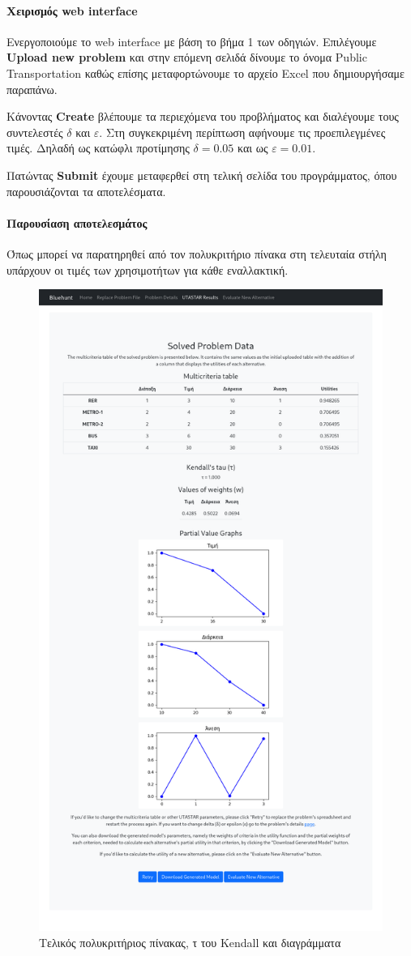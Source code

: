 \documentclass[11pt,a4paper,titlepage]{article}
\numberwithin{equation}{section}
\begin{document}
\paragraph{Χειρισμός web interface}
Ενεργοποιούμε το web interface με βάση το βήμα 1 των οδηγιών. Επιλέγουμε \textbf{Upload new problem} και στην επόμενη σελιδά δίνουμε το όνομα Public Transportation καθώς επίσης μεταφορτώνουμε το αρχείο Excel που δημιουργήσαμε παραπάνω.

Κάνοντας \textbf{Create} βλέπουμε τα περιεχόμενα του προβλήματος και διαλέγουμε τους συντελεστές $δ$ και $ε$. Στη συγκεκριμένη περίπτωση αφήνουμε τις προεπιλεγμένες τιμές. Δηλαδή ως κατώφλι προτίμησης $δ = 0.05$ και ως $ε = 0.01$.

Πατώντας \textbf{Submit} έχουμε μεταφερθεί στη τελική σελίδα του προγράμματος, όπου παρουσιάζονται τα αποτελέσματα.

\paragraph{Παρουσίαση αποτελεσμάτος}
Όπως μπορεί να παρατηρηθεί από τον πολυκριτήριο πίνακα στη τελευταία στήλη υπάρχουν οι τιμές των χρησιμοτήτων για κάθε εναλλακτική.

\begin{figure}[H]
	\centering
	\includegraphics[width=0.8\linewidth]{media/results.png}
	\caption{Τελικός πολυκριτήριος πίνακας, τ του Kendall και διαγράμματα}
	\label{fig:results_1_1}
\end{figure}
\end{document}
